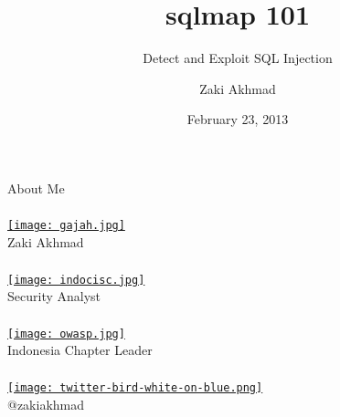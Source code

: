 \documentclass[xcolor=pdftex,table,10pt]{beamer}
\begin{document}
\title{sqlmap 101}
\subtitle{Detect and Exploit SQL Injection}
\author{Zaki Akhmad}
\date{February 23, 2013}

\begin{frame}
	\titlepage
\end{frame}

%


\begin{frame}
	\frametitle{}
	\begin{center}
		\LARGE{About Me}
	\end{center}
\end{frame}

\begin{frame}
	\frametitle{}
	\begin{center}
		\href{http://instagram.com/p/T5PWd1SX3o/}{\texttt{[image: gajah.jpg]}} \\
		Zaki Akhmad
	\end{center}
\end{frame}

\begin{frame}
	\frametitle{}
	\begin{center}
		\href{http://www.indocisc.or.id}{\texttt{[image: indocisc.jpg]}} \\
		Security Analyst
	\end{center}
\end{frame}

\begin{frame}
	\frametitle{}
	\begin{center}
		\href{http://owasp.or.id}{\texttt{[image: owasp.jpg]}} \\
		Indonesia Chapter Leader \\
	\end{center}
\end{frame}

\begin{frame}
	\frametitle{}
	\begin{center}
		\href{https://twitter.com/zakiakhmad}{\texttt{[image: twitter-bird-white-on-blue.png]}} \\
		@zakiakhmad \\
	\end{center}
\end{frame}
\end{document}
